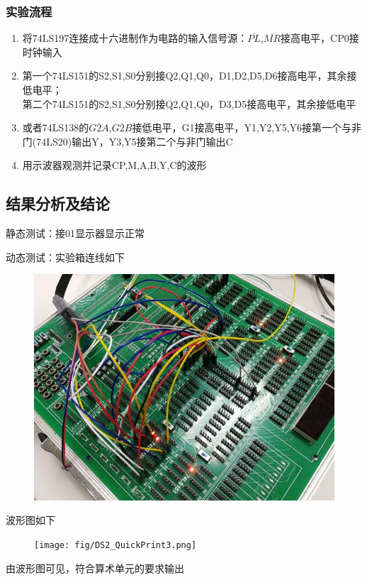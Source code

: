 \documentclass[11pt,UTF8]{ctexart}
\begin{document}
\subsubsection{实验流程}
\begin{enumerate}
    \item 将74LS197连接成十六进制作为电路的输入信号源：$\overline{PL}$,$\overline{MR}$接高电平，CP0接时钟输入
    \item 第一个74LS151的S2,S1,S0分别接Q2,Q1,Q0，D1,D2,D5,D6接高电平，其余接低电平；\\
    第二个74LS151的S2,S1,S0分别接Q2,Q1,Q0，D3,D5接高电平，其余接低电平
    \item 或者74LS138的$\overline{G2A}$,$\overline{G2B}$接低电平，G1接高电平，Y1,Y2,Y5,Y6接第一个与非门(74LS20)输出Y，Y3,Y5接第二个与非门输出C
    \item 用示波器观测并记录CP,M,A,B,Y,C的波形
\end{enumerate}

\subsection{结果分析及结论}
\par 静态测试：接01显示器显示正常
\par 动态测试：实验箱连线如下
\begin{figure}[H]
    \centering
    \includegraphics[width=0.6\linewidth]{fig/p3.jpg}
\end{figure}
\par 波形图如下
\begin{figure}[H]
    \centering
    \texttt{[image: fig/DS2\_QuickPrint3.png]}
\end{figure}
\par 由波形图可见，符合算术单元的要求输出
\end{document}

